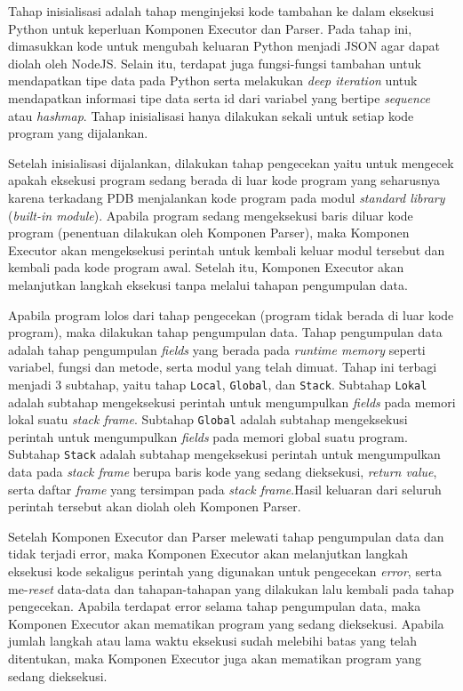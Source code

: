 Tahap inisialisasi adalah tahap menginjeksi kode tambahan ke dalam eksekusi Python untuk keperluan Komponen Executor dan Parser. Pada tahap ini, dimasukkan kode untuk mengubah keluaran Python menjadi JSON agar dapat diolah oleh NodeJS. Selain itu, terdapat juga fungsi-fungsi tambahan untuk mendapatkan tipe data pada Python serta melakukan \textit{deep iteration} untuk mendapatkan informasi tipe data serta id dari variabel yang bertipe \textit{sequence} atau \textit{hashmap}. Tahap inisialisasi hanya dilakukan sekali untuk setiap kode program yang dijalankan.

Setelah inisialisasi dijalankan, dilakukan tahap pengecekan yaitu untuk mengecek apakah eksekusi program sedang berada di luar kode program yang seharusnya karena terkadang PDB menjalankan kode program pada modul \textit{standard library} (\textit{built-in module}). Apabila program sedang mengeksekusi baris diluar kode program (penentuan dilakukan oleh Komponen Parser), maka Komponen Executor akan mengeksekusi perintah untuk kembali keluar modul tersebut dan kembali pada kode program awal. Setelah itu, Komponen Executor akan melanjutkan langkah eksekusi tanpa melalui tahapan pengumpulan data.

Apabila program lolos dari tahap pengecekan (program tidak berada di luar kode program), maka dilakukan tahap pengumpulan data. Tahap pengumpulan data adalah tahap pengumpulan \textit{fields} yang berada pada \textit{runtime memory} seperti variabel, fungsi dan metode, serta modul yang telah dimuat. Tahap ini terbagi menjadi 3 subtahap, yaitu tahap \verb|Local|, \verb|Global|, dan \verb|Stack|. Subtahap \verb|Lokal| adalah subtahap mengeksekusi perintah untuk mengumpulkan \textit{fields} pada memori lokal suatu \textit{stack frame}. Subtahap \verb|Global| adalah subtahap mengeksekusi perintah untuk mengumpulkan \textit{fields} pada memori global suatu program. Subtahap \verb|Stack| adalah subtahap mengeksekusi perintah untuk mengumpulkan data pada \textit{stack frame} berupa baris kode yang sedang dieksekusi, \textit{return value}, serta daftar \textit{frame} yang tersimpan pada \textit{stack frame}.Hasil keluaran dari seluruh perintah tersebut akan diolah oleh Komponen Parser.

Setelah Komponen Executor dan Parser melewati tahap pengumpulan data dan tidak terjadi error, maka Komponen Executor akan melanjutkan langkah eksekusi kode sekaligus perintah yang digunakan untuk pengecekan \textit{error}, serta me-\textit{reset} data-data dan tahapan-tahapan yang dilakukan lalu kembali pada tahap pengecekan. Apabila terdapat error selama tahap pengumpulan data, maka Komponen Executor akan mematikan program yang sedang dieksekusi. Apabila jumlah langkah atau lama waktu eksekusi sudah melebihi batas yang telah ditentukan, maka Komponen Executor juga akan mematikan program yang sedang dieksekusi.

